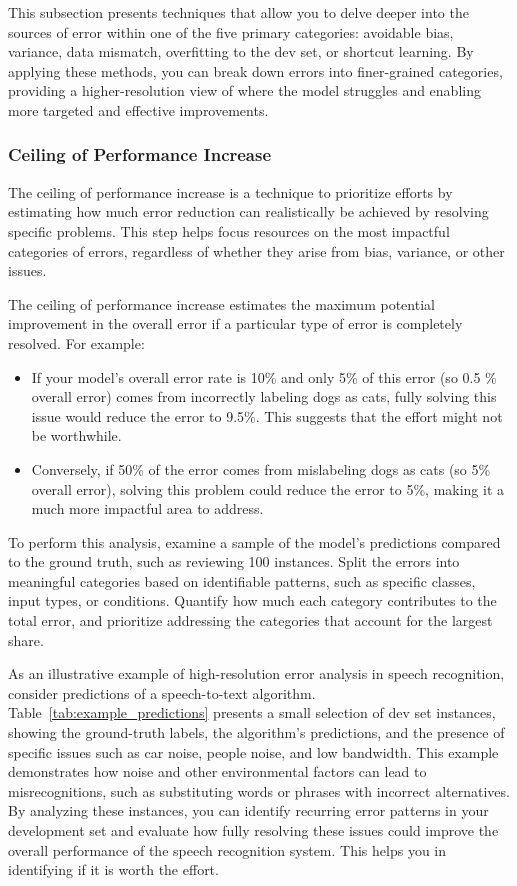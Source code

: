 \documentclass[12pt,openany, draft]{book}
\begin{document}
This subsection presents techniques that allow you to delve deeper into the sources of error within one of the five primary categories: avoidable bias, variance, data mismatch, overfitting to the dev set, or shortcut learning. By applying these methods, you can break down errors into finer-grained categories, providing a higher-resolution view of where the model struggles and enabling more targeted and effective improvements.

\subsubsection{Ceiling of Performance Increase}

The ceiling of performance increase is a technique to prioritize efforts by estimating how much error reduction can realistically be achieved by resolving specific problems. This step helps focus resources on the most impactful categories of errors, regardless of whether they arise from bias, variance, or other issues. \newline

The ceiling of performance increase estimates the maximum potential improvement in the overall error if a particular type of error is completely resolved. For example:
\begin{itemize}
    \item If your model's overall error rate is 10\% and only 5\% of this error (so 0.5 \% overall error) comes from incorrectly labeling dogs as cats, fully solving this issue would reduce the error to 9.5\%. This suggests that the effort might not be worthwhile.
    \item Conversely, if 50\% of the error comes from mislabeling dogs as cats (so 5\% overall error), solving this problem could reduce the error to 5\%, making it a much more impactful area to address.
\end{itemize}

To perform this analysis, examine a sample of the model's predictions compared to the ground truth, such as reviewing 100 instances. Split the errors into meaningful categories based on identifiable patterns, such as specific classes, input types, or conditions. Quantify how much each category contributes to the total error, and prioritize addressing the categories that account for the largest share. \newline

As an illustrative example of high-resolution error analysis in speech recognition, consider  predictions of a speech-to-text algorithm. Table~\ref{tab:example_predictions} presents a small selection of dev set instances, showing the ground-truth labels, the algorithm’s predictions, and the presence of specific issues such as car noise, people noise, and low bandwidth. This example demonstrates how noise and other environmental factors can lead to misrecognitions, such as substituting words or phrases with incorrect alternatives. By analyzing these instances, you can identify recurring error patterns in your development set and evaluate how fully resolving these issues could improve the overall performance of the speech recognition system. This helps you in identifying if it is worth the effort.
\end{document}
